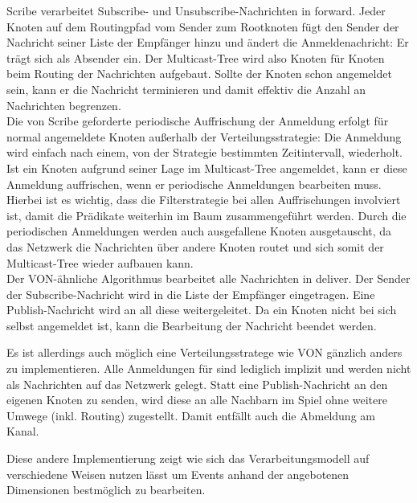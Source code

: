 Scribe verarbeitet Subscribe- und Unsubscribe-Nachrichten in forward. Jeder Knoten auf dem Routingpfad vom Sender zum Rootknoten fügt den Sender der Nachricht seiner Liste der Empfänger hinzu und ändert die Anmeldenachricht: Er trägt sich als Absender ein. Der Multicast-Tree wird also Knoten für Knoten beim Routing der Nachrichten aufgebaut. Sollte der Knoten schon angemeldet sein, kann er die Nachricht terminieren und damit effektiv die Anzahl an Nachrichten begrenzen.\\
Die von Scribe geforderte periodische Auffrischung der Anmeldung erfolgt für normal angemeldete Knoten außerhalb der Verteilungsstrategie: Die Anmeldung wird einfach nach einem, von der Strategie bestimmten Zeitintervall, wiederholt. Ist ein Knoten aufgrund seiner Lage im Multicast-Tree angemeldet, kann er diese Anmeldung auffrischen, wenn er periodische Anmeldungen bearbeiten muss. Hierbei ist es wichtig, dass die Filterstrategie bei allen Auffrischungen involviert ist, damit die Prädikate weiterhin im Baum zusammengeführt werden. Durch die periodischen Anmeldungen werden auch ausgefallene Knoten ausgetauscht, da das Netzwerk die Nachrichten über andere Knoten routet und sich somit der Multicast-Tree wieder aufbauen kann.\\
Der VON-ähnliche Algorithmus bearbeitet alle Nachrichten in deliver. Der Sender der Subscribe-Nachricht wird in die Liste der Empfänger eingetragen. Eine Publish-Nachricht wird an all diese weitergeleitet. Da ein Knoten nicht bei sich selbst angemeldet ist, kann die Bearbeitung der Nachricht beendet werden.

Es ist allerdings auch möglich eine Verteilungsstratege wie VON gänzlich anders zu implementieren. Alle Anmeldungen für sind lediglich implizit und werden nicht als Nachrichten auf das Netzwerk gelegt. Statt eine Publish-Nachricht an den eigenen Knoten zu senden, wird diese an alle Nachbarn im Spiel ohne weitere Umwege (inkl. Routing) zugestellt. Damit entfällt auch die Abmeldung am Kanal.

Diese andere Implementierung zeigt wie sich das Verarbeitungsmodell auf verschiedene Weisen nutzen lässt um Events anhand der angebotenen Dimensionen bestmöglich zu bearbeiten.
